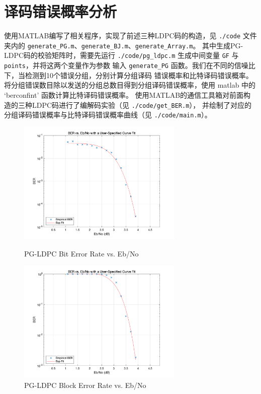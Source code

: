 \documentclass[lang=cn,11pt,a4paper,numbers]{elegantpaper}
\begin{document}
\section{译码错误概率分析}

使用MATLAB编写了相关程序，实现了前述三种LDPC码的构造，见 \lstinline{./code} 文件夹内的
 \lstinline{generate_PG.m}、\lstinline{generate_BJ.m}、\lstinline{generate_Array.m}。
 其中生成PG-LDPC码的校验矩阵时，需要先运行 \lstinline{./code/pg_ldpc.m} 
 生成中间变量 \lstinline{GF} 与 \lstinline{points}，并将这两个变量作为参数
 输入 \lstinline{generate_PG} 函数。我们在不同的信噪比下，当检测到10个错误分组，分别计算分组译码
 错误概率和比特译码错误概率。将分组错误数目除以发送的分组总数目得到分组译码错误概率，使用 matlab 中的
 `berconfint' 函数计算比特译码错误概率。
使用MATLAB的通信工具箱对前面构造的三种LDPC码进行了编解码实验（见 \lstinline{./code/get_BER.m}），
并绘制了对应的分组译码错误概率与比特译码错误概率曲线（见 \lstinline{./code/main.m}）。

\begin{figure}[htbp]
    \begin{minipage}[t]{0.5\linewidth}
    \centering
    \includegraphics[width=3.1in]{figure/pg_bit_er.png}
    \caption{PG-LDPC Bit Error Rate vs. Eb/No}
    \label{fig:pg_bit_er}
    \end{minipage}%
    \begin{minipage}[t]{0.5\linewidth}
    \centering
    \includegraphics[width=3.1in]{figure/pg_block_er.png}
    \caption{PG-LDPC Block Error Rate vs. Eb/No}
    \label{fig:pg_block_er}
    \end{minipage}
    \end{figure}
\end{document}

